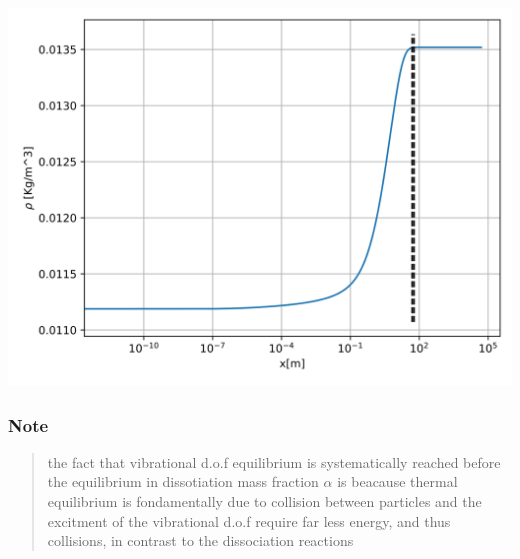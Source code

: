 \documentclass[
]{article}
\begin{document}
\includegraphics{images/45km/rho.svg}

\hypertarget{note}{%
\subsubsection{Note}\label{note}}

\begin{quote}
the fact that vibrational d.o.f equilibrium is systematically reached
before the equilibrium in dissotiation mass fraction \(\alpha\) is
beacause thermal equilibrium is fondamentally due to collision between
particles and the excitment of the vibrational d.o.f require far less
energy, and thus collisions, in contrast to the dissociation reactions
\end{quote}
\end{document}
